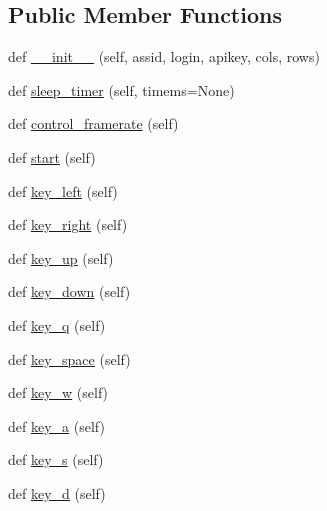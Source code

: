\subsection*{Public Member Functions}
\begin{DoxyCompactItemize}
\item 
def \hyperlink{classbridges_1_1non__blocking__game_1_1_non_blocking_game_a19362773d256eec033f04cfd00b7160c}{\+\_\+\+\_\+init\+\_\+\+\_\+} (self, assid, login, apikey, cols, rows)
\item 
def \hyperlink{classbridges_1_1non__blocking__game_1_1_non_blocking_game_a2e4dca6a290c65472200e69012e01d16}{sleep\+\_\+timer} (self, timems=None)
\item 
def \hyperlink{classbridges_1_1non__blocking__game_1_1_non_blocking_game_ad751eeccbf14adc09f9c11acce3757c9}{control\+\_\+framerate} (self)
\item 
def \hyperlink{classbridges_1_1non__blocking__game_1_1_non_blocking_game_ad6e23c265e1b710114459f0b666d25cb}{start} (self)
\item 
def \hyperlink{classbridges_1_1non__blocking__game_1_1_non_blocking_game_a87490ef28d161f22e753aab5d3e67e46}{key\+\_\+left} (self)
\item 
def \hyperlink{classbridges_1_1non__blocking__game_1_1_non_blocking_game_a31b6f78c39a93f0ba5350d346043bde9}{key\+\_\+right} (self)
\item 
def \hyperlink{classbridges_1_1non__blocking__game_1_1_non_blocking_game_a7e853081cefe51511de0c6438aeea871}{key\+\_\+up} (self)
\item 
def \hyperlink{classbridges_1_1non__blocking__game_1_1_non_blocking_game_af9a280c2d221140eddba0e4bcb0afb9b}{key\+\_\+down} (self)
\item 
def \hyperlink{classbridges_1_1non__blocking__game_1_1_non_blocking_game_a75e94a930466b607828b6ef092f810d6}{key\+\_\+q} (self)
\item 
def \hyperlink{classbridges_1_1non__blocking__game_1_1_non_blocking_game_a1059ffd8d5daa3a0db2e6847f5724883}{key\+\_\+space} (self)
\item 
def \hyperlink{classbridges_1_1non__blocking__game_1_1_non_blocking_game_abeb435c75a3022c50f472ee2a4207809}{key\+\_\+w} (self)
\item 
def \hyperlink{classbridges_1_1non__blocking__game_1_1_non_blocking_game_a7076d0ff62aeba49a0caf71e213361db}{key\+\_\+a} (self)
\item 
def \hyperlink{classbridges_1_1non__blocking__game_1_1_non_blocking_game_a2c587b12c3a8bc2b2e96bd2d09ceed1d}{key\+\_\+s} (self)
\item 
def \hyperlink{classbridges_1_1non__blocking__game_1_1_non_blocking_game_a0c90fcb365dcdb7ccf49b98b3e63ecc8}{key\+\_\+d} (self)
\end{DoxyCompactItemize}
